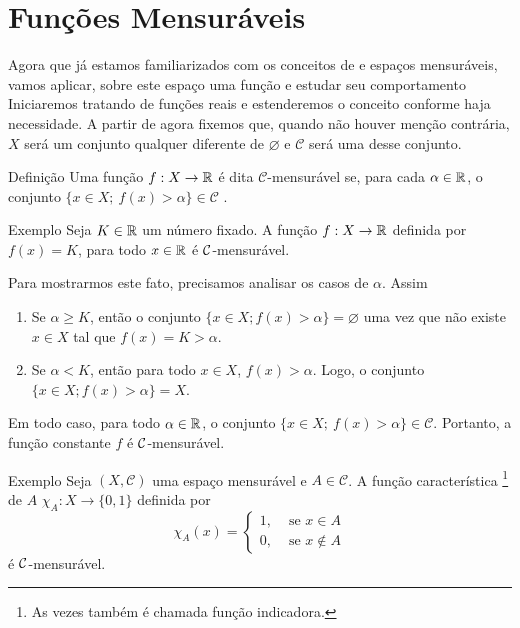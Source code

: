 \section{Funções Mensuráveis}
Agora que já estamos familiarizados com os conceitos de \sigal e espaços mensuráveis, vamos aplicar, sobre este espaço uma função e estudar seu comportamento
Iniciaremos tratando de funções reais e estenderemos o conceito conforme haja necessidade.
A partir de agora fixemos que, quando não houver menção contrária, $X$ será um conjunto qualquer diferente de $\varnothing$ e $\mathcal{C}$ será uma \sigal desse conjunto. 

\begin{env}{Definição}
	\label{def:mensurabilidade-funções-reais}
    Uma função $f: X \to \mathbb{R} $ é dita $\mathcal{C}$-mensurável se, para cada $\alpha \in \mathbb{R}$, o conjunto $\{x \in X;\ f(x) > \alpha\} \in \mathcal{C}$ \cite{bartle}.
    \vspace{-0.2cm}
\end{env}
\begin{env}{Exemplo}
\label{ex:funcao-constante}
	Seja $K \in \mathbb{R}$ um número fixado. 
	A função $f: X \to \mathbb{R}$ definida por $f(x) = K$, para todo $x \in \mathbb{R}$  é $\operatorname{\mathcal{C}}$-mensurável.
	\vspace{-0.2cm}
\end{env}
Para mostrarmos este fato, precisamos analisar os casos de $\alpha$.
Assim
	\begin{enumerate}[label*= (\Roman*)]
		\item Se $\alpha \geq K$, então o conjunto $\{x \in X; f(x) > \alpha\} = \varnothing$ uma vez que não existe $x \in X$ tal que $f(x)= K > \alpha$.
		\item Se $\alpha < K$, então para todo $x \in X$, $f(x) > \alpha$.
		Logo, o conjunto $\{x \in X; f(x) > \alpha\} = X$.
	\end{enumerate}
Em todo caso, para todo $\alpha \in \mathbb{R}$, o conjunto  $\{x \in X;\ f(x) > \alpha\} \in \mathcal{C}$.
Portanto, a função constante $f$ é $\operatorname{\mathcal{C}}$-mensurável.
\begin{env}{Exemplo}
    Seja $(X, \mathcal{C})$ uma espaço mensurável e $A \in \mathcal{C}$.
    A função característica \footnote{As vezes também é chamada  função indicadora.} de $A$ 
    $\chi_A: X \to \{0,1\}$ definida por 
    $$\chi_A(x) =\left\{\begin{array}{cc}
         1, & \textrm{\ se \ } x \in A \\
         0, & \textrm{\ se \ } x \notin A
    \end{array}\right.
    $$
    é $\operatorname{\mathcal{C}}$-mensurável.
    \vspace{-0.2cm}
\end{env}

